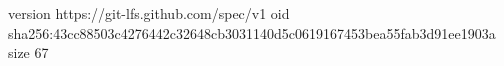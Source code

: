version https://git-lfs.github.com/spec/v1
oid sha256:43cc88503c4276442c32648cb3031140d5c0619167453bea55fab3d91ee1903a
size 67
